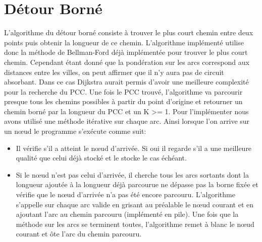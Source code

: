 \section{Détour Borné}
L'algorithme du détour borné consiste à trouver le plus court chemin entre deux points puis obtenir la longueur de ce chemin. L'algorithme implémenté utilise donc la méthode de Bellman-Ford déjà implémentée pour trouver le plus court chemin. Cependant étant donné que la pondération sur les arcs correspond aux distances entre les villes, on peut affirmer que il n'y aura pas de circuit absorbant. Dans ce cas Dijkstra aurait permis d'avoir une meilleure complexité pour la recherche du PCC.
Une fois le PCC trouvé, l'algorithme va parcourir presque tous les chemins possibles à partir du point d'origine et retourner un chemin borné par la longueur du PCC et un K >= 1. Pour l'implémenter nous avons utilisé une méthode itérative sur chaque arc. Ainsi lorsque l'on arrive sur un nœud le programme s'exécute comme suit:
\begin{itemize}
\item
Il vérifie s'il a atteint le nœud d'arrivée. Si oui il regarde s'il a une meilleure qualité que celui déjà stocké et le stocke le cas échéant.
\item
Si le nœud n'est pas celui d'arrivée, il cherche tous les arcs sortants dont la longueur ajoutée à la longueur déjà parcourue ne dépasse pas la borne fixée et vérifie que le nœud d'arrivée n'a pas été encore parcouru. L'algorithme s'appelle sur chaque arc valide en grisant au préalable le nœud courant et en ajoutant l'arc au chemin parcouru (implémenté en pile). Une fois que la méthode sur les arcs se terminent toutes, l'algorithme remet à blanc le nœud courant et ôte l'arc du chemin parcouru.
\end{itemize}



\clearpage
